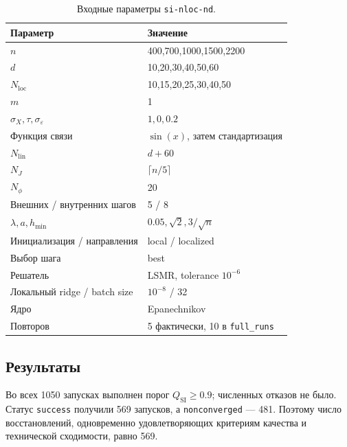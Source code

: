 \documentclass[11pt,a4paper]{article}
\newcommand{\code}[1]{\texttt{#1}}
\newcommand{\qsi}{Q_{\mathrm{SI}}}
\begin{document}
\begin{table}[ht]
\centering
\small
\begin{tabular}{l|l}
\hline
Параметр & Значение \\
\hline
$n$ & 400,700,1000,1500,2200 \\
$d$ & 10,20,30,40,50,60 \\
$N_{\mathrm{loc}}$ & 10,15,20,25,30,40,50 \\
$m$ & 1 \\
$\sigma_X,\tau,\sigma_\varepsilon$ & $1,0,0.2$ \\
Функция связи & $\sin(x)$, затем стандартизация \\
$N_{\mathrm{lin}}$ & $d+60$ \\
$N_J$ & $\lceil n/5\rceil$ \\
$N_\phi$ & 20 \\
Внешних / внутренних шагов & 5 / 8 \\
$\lambda,a,h_{\min}$ & $0.05,\sqrt2,3/\sqrt n$ \\
Инициализация / направления & local / localized \\
Выбор шага & best \\
Решатель & LSMR, tolerance $10^{-6}$ \\
Локальный ridge / batch size & $10^{-8}$ / 32 \\
Ядро & Epanechnikov \\
Повторов & 5 фактически, 10 в \code{full\_runs} \\
\hline
\end{tabular}
\caption{Входные параметры \code{si-nloc-nd}.}
\label{tab:si-nloc-nd-inputs}
\end{table}

\subsection{Результаты}

Во всех 1050 запусках выполнен порог $\qsi\geq0.9$; численных отказов не
было. Статус \code{success} получили 569 запусков, а
\code{nonconverged} --- 481. Поэтому число восстановлений, одновременно
удовлетворяющих критериям качества и технической сходимости, равно 569.
\end{document}
